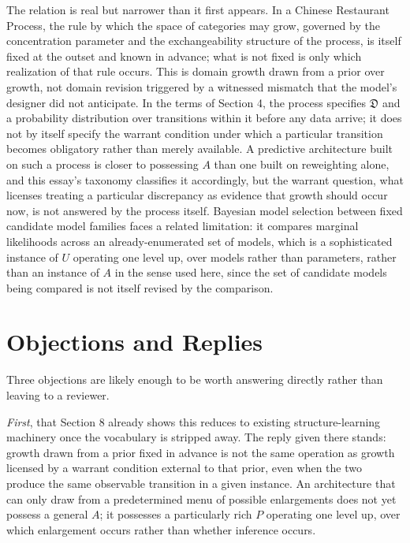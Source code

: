 \documentclass[11pt]{article}
\begin{document}
The relation is real but narrower than it first appears. In a Chinese Restaurant Process, the rule by which the space of categories may grow, governed by the concentration parameter and the exchangeability structure of the process, is itself fixed at the outset and known in advance; what is not fixed is only which realization of that rule occurs. This is domain growth drawn from a prior over growth, not domain revision triggered by a witnessed mismatch that the model's designer did not anticipate. In the terms of Section 4, the process specifies $\mathfrak{D}$ and a probability distribution over transitions within it before any data arrive; it does not by itself specify the warrant condition under which a particular transition becomes obligatory rather than merely available. A predictive architecture built on such a process is closer to possessing $A$ than one built on reweighting alone, and this essay's taxonomy classifies it accordingly, but the warrant question, what licenses treating a particular discrepancy as evidence that growth should occur now, is not answered by the process itself. Bayesian model selection between fixed candidate model families \citep{mackay2003} faces a related limitation: it compares marginal likelihoods across an already-enumerated set of models, which is a sophisticated instance of $U$ operating one level up, over models rather than parameters, rather than an instance of $A$ in the sense used here, since the set of candidate models being compared is not itself revised by the comparison.

\section{Objections and Replies}

Three objections are likely enough to be worth answering directly rather than leaving to a reviewer.

\textit{First}, that Section 8 already shows this reduces to existing structure-learning machinery once the vocabulary is stripped away. The reply given there stands: growth drawn from a prior fixed in advance is not the same operation as growth licensed by a warrant condition external to that prior, even when the two produce the same observable transition in a given instance. An architecture that can only draw from a predetermined menu of possible enlargements does not yet possess a general $A$; it possesses a particularly rich $P$ operating one level up, over which enlargement occurs rather than whether inference occurs.
\end{document}
